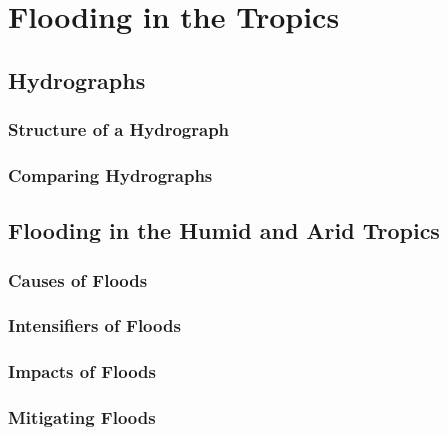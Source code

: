 \documentclass[../../main]{subfiles}
\begin{document}
\section{Flooding in the Tropics}

\subsection{Hydrographs}

\subsubsection{Structure of a Hydrograph}

\subsubsection{Comparing Hydrographs}

\subsection{Flooding in the Humid and Arid Tropics}

\subsubsection{Causes of Floods}

\subsubsection{Intensifiers of Floods}

\subsubsection{Impacts of Floods}

\subsubsection{Mitigating Floods}
\end{document}
